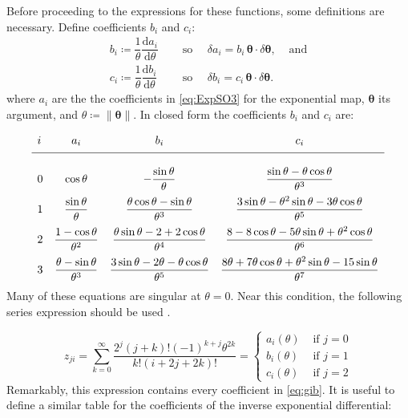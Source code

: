 Before proceeding to the expressions for these functions, some
definitions are necessary.
Define coefficients \(b_i\) and \(c_i\): %
\begin{equation*} 
\begin{array}{ccc}
b_i \coloneq \dfrac{1}{\theta} \dfrac{\mathrm{d} a_i }{\mathrm{d} \theta}
&\quad\text{ so }\quad
\delta a_i =b_i \,\bm{\theta} \cdot \delta \bm{\theta},
&\text{ and} \\[1ex]
c_i \coloneq \dfrac{1}{\theta} \dfrac{\mathrm{d} b_i }{\mathrm{d} \theta}
&\quad\text{ so }\quad
\delta b_i = c_i \, \bm{\theta} \cdot \delta \bm{\theta}.
\end{array}
\end{equation*}
where \(a_i\) are the the coefficients in \eqref{eq:ExpSO3} for the
exponential map, \(\bm{\theta}\) its argument, and \(\theta \coloneq \|\bm{\theta}\|\). 
In closed form the coefficients \(b_i\) and \(c_i\) are:

\begin{equation}
\begin{array}{lccc}
i & a_i & b_i & c_i \\[1ex] \hline \\[0.1ex]
0 & \cos \theta 
  & -\dfrac{\sin \theta}{\theta}
  & \dfrac{\sin \theta-\theta \cos \theta}{\theta^3}
\\[0.3cm] 
1 & \dfrac{\sin \theta}{\theta}
  & \dfrac{\theta \cos \theta-\sin \theta}{\theta^3}
  & \dfrac{3 \sin \theta-\theta^2 \sin \theta-3 \theta \cos \theta}{\theta^5}
\\[0.3cm]
2 & \dfrac{1-\cos \theta}{\theta^2} %
  & \dfrac{\theta \sin \theta-2+2 \cos \theta}{\theta^4}
  & \dfrac{8-8 \cos \theta-5 \theta \sin \theta+\theta^2 \cos \theta}{\theta^6} 
\\[0.3cm]
3 & \dfrac{\theta-\sin \theta}{\theta^3} 
  & \dfrac{3 \sin \theta-2 \theta-\theta \cos \theta}{\theta^5} 
  & \dfrac{8 \theta+7 \theta \cos \theta+\theta^2 \sin \theta-15 \sin \theta}{\theta^7}
\end{array}
\label{eq:gib}\end{equation}
Many of these equations are singular at \(\theta = 0\).
Near this condition, the following series
expression should be used \citep{ritto-corrêa2002differentiation}.

\begin{equation}
z_{j i}=\sum_{k=0}^{\infty} \frac{2^j(j+k) !(-1)^{k+j} \theta^{2 k}}{k !(i+2 j+2 k) !}= \begin{cases}
a_i(\theta) & \text { if } j=0 \\ 
b_i(\theta) & \text { if } j=1 \\ 
c_i(\theta) & \text { if } j=2
\end{cases}
\label{eq:gib-series}
\end{equation}
Remarkably, this expression contains
every coefficient in \eqref{eq:gib}.
It is useful to define a similar table for %
the coefficients of the inverse exponential differential:

